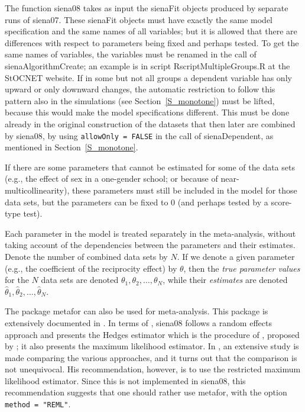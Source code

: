 \documentclass[a4paper,fleqn,11pt]{article}
\newcommand{\+}{\, + \,}
\newcommand{\sfn}[1]{\textsf{#1}}
\newcommand{\SN}{{\sf StOCNET }}
\begin{document}
The function  \textsf{siena08} takes as input the \textsf{sienaFit}
objects produced by separate runs of  \textsf{siena07}.
These \textsf{sienaFit} objects must have exactly the same model
specification and the same names of all variables; but it is allowed
that there are differences with respect to parameters being fixed
and perhaps tested. To get the same names of variables, the
variables must be renamed in the call of \textsf{sienaAlgorithmCreate};
an example is in script \textsf{RscriptMultipleGroups.R} at the \SN website.
If in some but not all groups a dependent variable has only upward or
only downward changes, the automatic restriction to follow this pattern also
in the simulations (see Section~\ref{S_monotone}) must be lifted,
because this would make the model specifications different.
This must be done already in the original construction of the datasets that
then later are combined by \textsf{siena08},
by using \texttt{allowOnly = FALSE} in the call of \textsf{sienaDependent},
as mentioned in Section~\ref{S_monotone}.

If there are some parameters that cannot be estimated for some of the data sets
(e.g., the effect of sex in a one-gender school; or because of
near-multicollinearity), these parameters must still be included
in the model for those data sets, but the parameters can be fixed to 0
(and perhaps tested by a score-type test).
\medskip

Each parameter in the model is treated separately
in the meta-analysis, without taking account of the
dependencies between the parameters and their estimates.
Denote the number of combined data sets by $N$.
If we denote a given parameter (e.g., the
coefficient of the reciprocity effect) by $\theta$,
then the \emph{true parameter values} for the
$N$ data sets are denoted $\theta_1, \theta_2, \ldots, \theta_N$,
while their \emph{estimates} are denoted
 $\hat\theta_1, \hat\theta_2, \ldots, \hat\theta_N$.
 \bigskip

The package \sfn{metafor} can also be used for meta-analysis.
This package is extensively documented in \citet{Viechtbauer2010}.
In terms of \citet{Viechtbauer2010}, \sfn{siena08} follows a
random effects approach and presents the Hedges estimator
which is the procedure of \citet{SnijdersBaerveldt03}, proposed
by \citet{Cochran54}; it also presents the maximum likelihood
estimator.
In \citet{Viechtbauer2005}, an extensive study is made comparing
the various approaches, and it turns out that the comparison is
not unequivocal. His recommendation, however, is to use the
restricted maximum likelihood estimator.
Since this is not implemented in \sfn{siena08}, this recommendation
suggests that one should rather use  \sfn{metafor}, with the
option \texttt{method = "REML"}.
\end{document}
